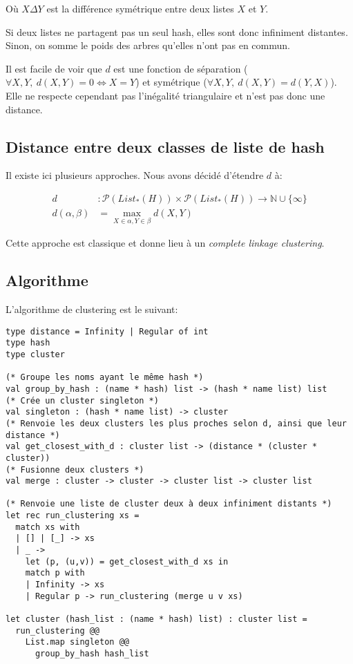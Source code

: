 Où $X \Delta Y$ est la différence symétrique entre deux listes $X$ et $Y$.

Si deux listes ne partagent pas un seul hash, elles sont donc infiniment distantes. Sinon, on somme le poids des arbres qu'elles n'ont pas en commun.

Il est facile de voir que $d$ est une fonction de séparation ($\forall X,Y,\ d(X,Y) = 0 \iff X = Y$) et symétrique ($\forall X,Y,\ d(X,Y) = d(Y,X)$). Elle ne respecte cependant pas l'inégalité triangulaire et n'est pas donc une distance.


\subsection{Distance entre deux classes de liste de hash}
Il existe ici plusieurs approches.
Nous avons décidé d'étendre $d$ à:

\begin{align*}
d &: \mathcal{P}(List_*(H)) \times \mathcal{P}(List_*(H)) \to \mathbb{N} \cup \{\infty\}\\
d(\alpha,\beta) &= \max\limits_{X \in \alpha, Y \in \beta} d(X,Y)
\end{align*}

Cette approche est classique et donne lieu à un \emph{complete linkage clustering}.

\subsection{Algorithme}
L'algorithme de clustering est le suivant:

\begin{verbatim}
type distance = Infinity | Regular of int
type hash
type cluster

(* Groupe les noms ayant le même hash *)
val group_by_hash : (name * hash) list -> (hash * name list) list
(* Crée un cluster singleton *)
val singleton : (hash * name list) -> cluster
(* Renvoie les deux clusters les plus proches selon d, ainsi que leur distance *)
val get_closest_with_d : cluster list -> (distance * (cluster * cluster))
(* Fusionne deux clusters *)
val merge : cluster -> cluster -> cluster list -> cluster list

(* Renvoie une liste de cluster deux à deux infiniment distants *)
let rec run_clustering xs =
  match xs with
  | [] | [_] -> xs
  | _ ->
    let (p, (u,v)) = get_closest_with_d xs in
    match p with
    | Infinity -> xs
    | Regular p -> run_clustering (merge u v xs)

let cluster (hash_list : (name * hash) list) : cluster list =
  run_clustering @@
    List.map singleton @@
      group_by_hash hash_list
\end{verbatim}